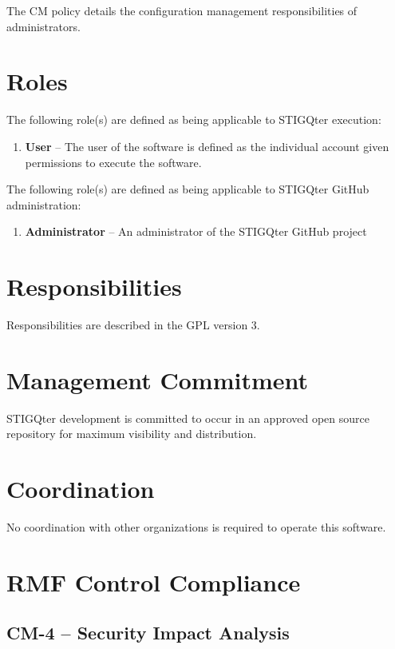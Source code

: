 \documentclass[letterpaper, 10pt, twoside]{article}
\begin{document}
The CM policy details the configuration management responsibilities of administrators.

\section{Roles}
\label{sec:roles}

The following role(s) are defined as being applicable to STIGQter execution:
\begin{enumerate}
	\item \textbf{User} -- The user of the software is defined as the individual account given permissions to execute the software.
\end{enumerate}

The following role(s) are defined as being applicable to STIGQter GitHub administration:
\begin{enumerate}
	\item \textbf{Administrator} -- An administrator of the STIGQter GitHub project
\end{enumerate}

\section{Responsibilities}
\label{sec:responsibilities}

Responsibilities are described in the GPL version 3.

\section{Management Commitment}

STIGQter development is committed to occur in an approved open source repository for maximum visibility and distribution.

\section{Coordination}

No coordination with other organizations is required to operate this software.

\section{RMF Control Compliance}

\subsection{CM-4 -- Security Impact Analysis}
\end{document}
